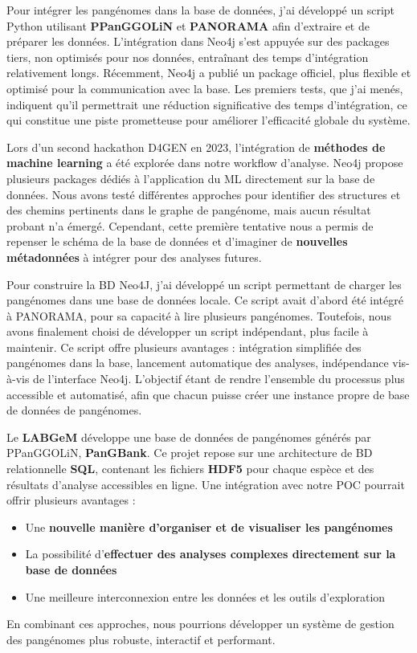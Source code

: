 Pour intégrer les pangénomes dans la base de données, j'ai développé un script Python utilisant \textbf{PPanGGOLiN} et \textbf{PANORAMA} afin d’extraire et de préparer les données. L’intégration dans Neo4j s’est appuyée sur des packages tiers, non optimisés pour nos données, entraînant des temps d’intégration relativement longs. Récemment, Neo4j a publié un package officiel, plus flexible et optimisé pour la communication avec la base. Les premiers tests, que j'ai menés, indiquent qu’il permettrait une réduction significative des temps d’intégration, ce qui constitue une piste prometteuse pour améliorer l'efficacité globale du système.

Lors d’un second hackathon D4GEN en 2023, l’intégration de \textbf{méthodes de machine learning} a été explorée dans notre workflow d’analyse. Neo4j propose plusieurs packages dédiés à l’application du ML directement sur la base de données. Nous avons testé différentes approches pour identifier des structures et des chemins pertinents dans le graphe de pangénome, mais aucun résultat probant n’a émergé.
Cependant, cette première tentative nous a permis de repenser le schéma de la base de données et d'imaginer de \textbf{nouvelles métadonnées} à intégrer pour des analyses futures.

Pour construire la BD Neo4J, j'ai développé un script permettant de charger les pangénomes dans une base de données locale. Ce script avait d'abord été intégré à PANORAMA, pour sa capacité à lire plusieurs pangénomes. Toutefois, nous avons finalement choisi de développer un script indépendant, plus facile à maintenir. Ce script offre plusieurs avantages : intégration simplifiée des pangénomes dans la base, lancement automatique des analyses, indépendance vis-à-vis de l’interface Neo4j.
L’objectif étant de rendre l’ensemble du processus plus accessible et automatisé, afin que chacun puisse créer une instance propre de base de données de pangénomes.

Le \textbf{LABGeM} développe une base de données de pangénomes générés par PPanGGOLiN, \textbf{PanGBank}. Ce projet repose sur une architecture de BD relationnelle \textbf{SQL}, contenant les fichiers \textbf{HDF5} pour chaque espèce et des résultats d’analyse accessibles en ligne.
Une intégration avec notre POC pourrait offrir plusieurs avantages :
\begin{itemize}
    \item Une \textbf{nouvelle manière d’organiser et de visualiser les pangénomes}
    \item La possibilité d’\textbf{effectuer des analyses complexes directement sur la base de données}
    \item Une meilleure interconnexion entre les données et les outils d’exploration
\end{itemize}
En combinant ces approches, nous pourrions développer un système de gestion des pangénomes plus robuste, interactif et performant.
